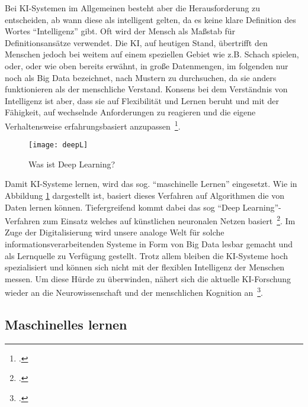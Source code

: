 Bei \ac{KI}-Systemen im Allgemeinen besteht aber die Herausforderung zu entscheiden, ab wann diese als intelligent gelten, da es keine klare Definition des Wortes \enquote{Intelligenz} gibt.
Oft wird der Mensch als Maßstab für Definitionsansätze verwendet. Die \ac{KI}, auf heutigen Stand, übertrifft den Menschen jedoch bei weitem auf einem speziellen Gebiet wie z.B. Schach spielen,
oder, oder wie oben bereits erwähnt, in große Datenmengen, im folgenden nur noch als Big Data bezeichnet, nach Mustern zu durchsuchen, da sie anders funktionieren als der menschliche Verstand.
Konsens bei dem Verständnis von Intelligenz ist aber, dass sie auf Flexibilität und Lernen beruht und mit der Fähigkeit, auf wechselnde Anforderungen zu reagieren und die eigene 
Verhaltensweise erfahrungsbasiert anzupassen~\footcite[\vglf][]{Lenzen.2020}. 

\begin{figure}[H]
    \caption{Was ist Deep Learning?}
    \texttt{[image: deepL]}
    \label{fig:deepL}
    \\
    \cite[Quelle: Vgl.][]{DeepLearning}
\end{figure}

Damit \ac{KI}-Systeme lernen, wird das sog. \enquote{maschinelle Lernen} eingesetzt. Wie in Abbildung \ref{fig:deepL} dargestellt ist, basiert dieses Verfahren auf Algorithmen die von Daten lernen können. Tiefergreifend kommt dabei das 
sog \enquote{Deep Learning}-Verfahren zum Einsatz welches auf künstlichen neuronalen Netzen basiert~\footcite[\vglf][]{Lenzen.2020}.
Im Zuge der Digitalisierung wird unsere analoge Welt für solche informationsverarbeitenden Systeme in Form von Big Data lesbar gemacht und als Lernquelle zu Verfügung gestellt.
Trotz allem bleiben die \ac{KI}-Systeme hoch spezialisiert und können sich nicht mit der flexiblen Intelligenz der Menschen messen. Um diese Hürde zu überwinden, nähert sich die 
aktuelle \ac{KI}-Forschung wieder an die Neurowissenschaft und der menschlichen Kognition an~\footcite[\vglf][]{Lenzen.2020}.

\subsection{Maschinelles lernen}

